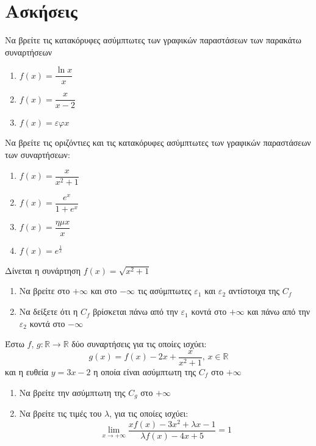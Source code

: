 \documentclass{../presentation}
\begin{document}
\moodle

\section{Ασκήσεις}

\exerices

\begin{askisi}
  Να βρείτε τις κατακόρυφες ασύμπτωτες των γραφικών παραστάσεων των παρακάτω συναρτήσεων
  \begin{enumerate}
    \item<1-> $f(x)=\dfrac{\ln x}{x}$
    \item<2-> $f(x)=\dfrac{x}{x-2}$
    \item<3-> $f(x)=εφ x$
  \end{enumerate}

\end{askisi}

\begin{askisi}
  Να βρείτε τις οριζόντιες και τις κατακόρυφες ασύμπτωτες των γραφικών παραστάσεων των συναρτήσεων:
  \begin{enumerate}
    \item<1-> $f(x)=\dfrac{x}{x^2+1}$
    \item<2-> $f(x)=\dfrac{e^x}{1+e^x}$
    \item<3-> $f(x)=\dfrac{ημx}{x}$
    \item<4-> $f(x)=e^{\frac{1}{x}}$
  \end{enumerate}

\end{askisi}

\begin{askisi}
  Δίνεται η συνάρτηση $f(x)=\sqrt{x^2+1}$
  \begin{enumerate}
    \item<1-> Να βρείτε στο $+\infty$ και στο $-\infty$ τις ασύμπτωτες $ε_1$ και $ε_2$ αντίστοιχα της $C_f$
    \item<2-> Να δείξετε ότι η $C_f$ βρίσκεται πάνω από την $ε_1$ κοντά στο $+\infty$ και πάνω από την $ε_2$ κοντά στο $-\infty$
  \end{enumerate}

\end{askisi}

\begin{askisi}
  Έστω $f$, $g:\mathbb{R}\to\mathbb{R}$ δύο συναρτήσεις για τις οποίες ισχύει:
  $$g(x)=f(x)-2x+\dfrac{x}{x^2+1} \text{, } x\in\mathbb{R}$$
  και η ευθεία $y=3x-2$ η οποία είναι ασύμπτωτη της $C_f$ στο $+\infty$
  \begin{enumerate}
    \item<1-> Να βρείτε την ασύμπτωτη της $C_g$ στο $+\infty$
    \item<2-> Να βρείτε τις τιμές του $λ$, για τις οποίες ισχύει:
          $$\lim\limits_{x \to +\infty}{ \dfrac{xf(x)-3x^2+λx-1}{λf(x)-4x+5} }=1$$
  \end{enumerate}

\end{askisi}
\end{document}
